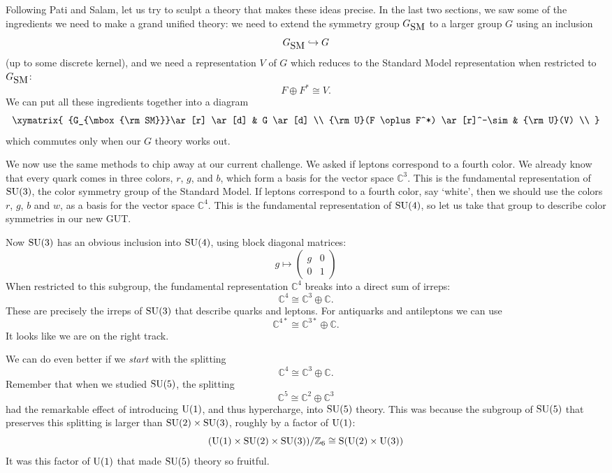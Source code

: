 \documentclass{article}
\newcommand{\C}{{\mathbb C}}  %
\newcommand{\Z}{{\mathbb Z}}  %
\newcommand{\U}{{\rm U}}    %
\renewcommand{\S}{{\rm S}}    %
\newcommand{\SU}{{\rm SU}}    %
\newcommand{\inclusion}{\hookrightarrow}
\newcommand{\iso}{\cong} %
\newcommand{\GSM}{{G_{\mbox{\rm SM}}}}  %
\begin{document}
Following Pati and Salam, let us try to sculpt a theory that makes
these ideas precise.  In the last two sections, we saw some of the
ingredients we need to make a grand unified theory: we need to extend
the symmetry group $\GSM$ to a larger group $G$ using an inclusion
\[ \GSM \inclusion G \]
(up to some discrete kernel), and we need a representation $V$ of $G$ which
reduces to the Standard Model representation when restricted to $\GSM$:
\[ F \oplus F^* \iso V. \]
We can put all these ingredients together into a diagram
\[
\xymatrix{
	\GSM \ar[r] \ar[d] & G \ar[d] \\
	\U(F \oplus F^*) \ar[r]^-\sim    & \U(V)   \\
}
\]
which commutes only when our $G$ theory works out.

We now use the same methods to chip away at our current challenge.  We
asked if leptons correspond to a fourth color.  We already know that
every quark comes in three colors, $r$, $g$, and $b$, which form a basis 
for the vector space $\C^3$.  This is the fundamental representation 
of $\SU(3)$, the color symmetry group of the Standard Model.  If leptons 
correspond to a fourth color, say `white', then we should use the colors 
$r$, $g$, $b$ and $w$, as a basis for the vector space $\C^4$.  This is the 
fundamental representation of $\SU(4)$, so let us take that group to
describe color symmetries in our new GUT.

Now $\SU(3)$ has an obvious inclusion into $\SU(4)$, using block 
diagonal matrices:
\[ g \mapsto 
\left(
\begin{array}{cc}
	g & 0 \\
	0 & 1
\end{array}
\right)
\]
When restricted to this subgroup, the fundamental 
representation $\C^4$ breaks into a direct sum of irreps:
\[ \C^4 \iso \C^3 \oplus \C. \]
These are precisely the irreps of $\SU(3)$ that describe
quarks and leptons.  For antiquarks and antileptons we can use
\[ \C^{4*} \iso \C^{3*} \oplus \C. \]
It looks like we are on the right track.

We can do even better if we \emph{start} with the splitting 
\[     \C^4 \iso \C^3 \oplus \C.   \]
Remember that when we studied $\SU(5)$, the splitting 
\[ \C^5 \iso \C^2 \oplus \C^3 \]
had the remarkable effect of introducing $\U(1)$, and thus hypercharge, into
$\SU(5)$ theory.  This was because the subgroup of 
$\SU(5)$ that preserves this splitting is larger than $\SU(2) \times
\SU(3)$, roughly by a factor of $\U(1)$:
\[ (\U(1) \times \SU(2) \times \SU(3)) / \Z_6 \iso \S(\U(2) \times \U(3)) \]
It was this factor of $\U(1)$ that made $\SU(5)$ theory so fruitful.
\end{document}
